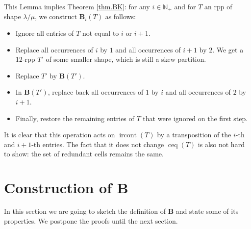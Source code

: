 \documentclass[12pt]{article}
\theoremstyle{plain}
\theoremstyle{definition}
\newcommand{\Nplus}{\mathbb{N}_{+}}
\def\ceq{{\operatorname{ceq}}}
\def\ircont{{\operatorname{ircont}}}
\def\lm{{\lambda/\mu}}
\def\B{{\mathbf{B}}}
\begin{document}
 This Lemma implies Theorem \ref{thm.BK}: for any $i\in\Nplus$ and for $T$ an rpp of shape $\lm$, we construct $\B_i(T)$ as follows: 
 \begin{itemize}
  \item Ignore all entries of $T$ not equal to $i$ or $i+1$. 
  \item Replace all occurrences of $i$ by $1$ and all occurrences of $i+1$ by $2$. We get a 12-rpp $T'$ of some smaller shape, which is still a skew partition.
  \item Replace $T'$ by $\B(T')$.
  \item In $\B(T')$, replace back all occurrences of $1$ by $i$ and all occurrences of $2$ by $i+1$.
  \item Finally, restore the remaining entries of $T$ that were ignored on the first step.
 \end{itemize}
 
 It is clear that this operation acts on $\ircont(T)$ by a transposition of the $i$-th and $i+1$-th entries. The fact that it does not change $\ceq(T)$ is also not hard to show: the set of redundant cells remains the same.

\def\B{{\mathbf{B}}}

\section{Construction of $\mathbf{B}$\label{sect.construction}}

In this section we are going to sketch the definition of $\mathbf{B}$ and state some of its properties. We postpone the proofs until the next section.
\end{document}
